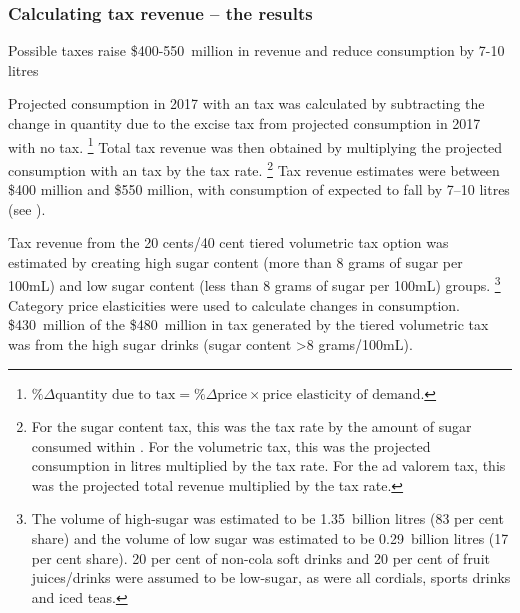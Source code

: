 \documentclass[embargoed]{grattan}
\begin{document}
\subsubsection{Calculating \SSB{} tax revenue -- the results }\label{calculating-ssb-tax-revenue-the-results}

\begin{table}
\caption{Possible \SSB{} taxes raise \$400-550~million in revenue and reduce \SSB{} consumption by 7-10 litres}\label{tbl:SSB-taxes-raise-money}



\end{table}

Projected consumption in 2017 with an \SSB{} tax was calculated by subtracting the change in quantity due to the excise tax from projected consumption in 2017 with no \SSB{} tax.%
\footnote{\(\% \Delta \text{quantity due to tax} = \% \Delta \text{price} \times \text{price elasticity of demand}\).} 
Total tax revenue was then obtained by multiplying the projected consumption with an \SSB{} tax by the tax rate.%
\footnote{For the sugar content tax, this was the tax rate by the amount of sugar consumed within \SSBs{}.
For the volumetric tax, this was the projected consumption in litres multiplied by the tax rate.
For the ad valorem tax, this was the projected total revenue multiplied by the tax rate.} Tax revenue estimates were between \$400 million and \$550 million, with consumption of \SSBs{} expected to fall by 7--10 litres (see ).


Tax revenue from the 20 cents/40 cent tiered volumetric \SSB{} tax option was estimated by creating high sugar content (more than 8 grams of sugar per 100mL) and low sugar content (less than 8 grams of sugar per 100mL) \SSB{} groups.%
\footnote{The volume of high-sugar \SSBs{} was estimated to be 1.35~billion litres (83 per cent share) and the volume of low sugar \SSBs{} was estimated to be 0.29~billion litres (17 per cent share). 20 per cent of non-cola soft drinks and 20 per cent of fruit juices/drinks were assumed to be low-sugar, as were all cordials, sports drinks and iced teas.} Category price elasticities were used to calculate changes in consumption. \$430~million of the \$480~million in tax generated by the tiered volumetric tax was from the high sugar drinks (sugar content \textgreater{}8 grams/100mL).
\end{document}
